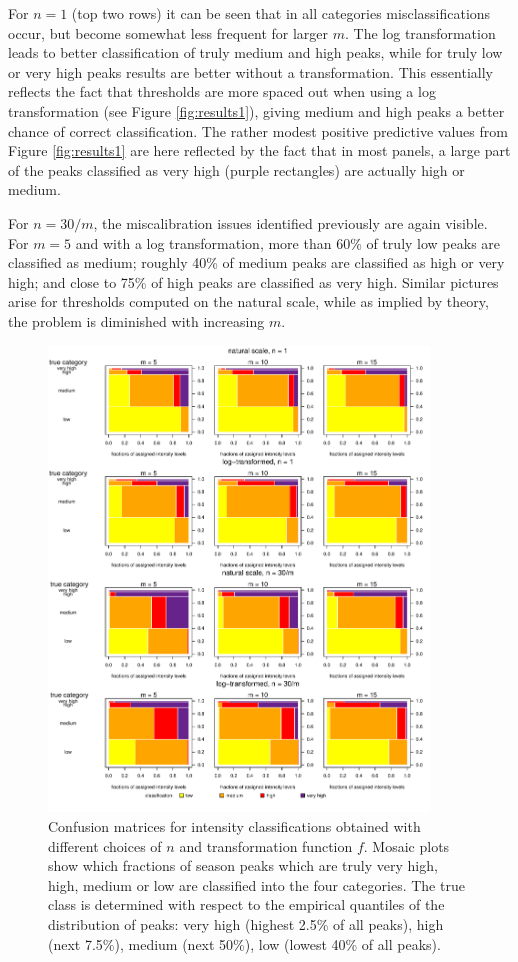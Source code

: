 \documentclass{article}
\begin{document}
For $n = 1$ (top two rows) it can be seen that in all categories misclassifications occur, but become somewhat less frequent for larger $m$. The log transformation leads to better classification of truly medium and high peaks, while for truly low or very high peaks results are better without a transformation. This essentially reflects the fact that thresholds are more spaced out when using a log transformation (see Figure \ref{fig:results1}), giving medium and high peaks a better chance of correct classification. The rather modest positive predictive values from Figure \ref{fig:results1} are here reflected by the fact that in most panels, a large part of the peaks classified as very high (purple rectangles) are actually high or medium.

For $n = 30/m$, the miscalibration issues identified previously are again visible. For $m = 5$ and with a log transformation, more than 60\% of truly low peaks are classified as medium; roughly 40\% of medium peaks are classified as high or very high; and close to 75\% of high peaks are classified as very high. Similar pictures arise for thresholds computed on the natural scale, while as implied by theory, the problem is diminished with increasing $m$.

\begin{figure}
\includegraphics[width=0.9\textwidth]{figure/mosaic_fr.pdf}
\caption{Confusion matrices for intensity classifications obtained with different choices of $n$ and transformation function $f$. Mosaic plots show which fractions of season peaks which are truly very high, high, medium or low are classified into the four categories. The true class is determined with respect to the empirical quantiles of the distribution of peaks: very high (highest 2.5\% of all peaks), high (next 7.5\%), medium (next 50\%), low (lowest 40\% of all peaks).}
\label{fig:mosaic}
\end{figure}
\end{document}
